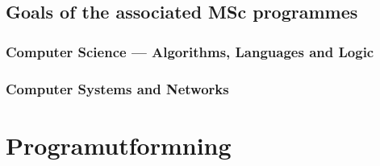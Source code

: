 \documentclass[twocolumn]{article}
\begin{document}



\subsection{Goals of the associated MSc programmes}
\subsubsection{Computer Science --- Algorithms, Languages and Logic}


\subsubsection{Computer Systems and Networks}



\section{Programutformning}
\newcommand{\courselink}[2]{\href{https://www.student.chalmers.se/sp/course?course_id=#1}{#2}}

\newcommand{\introFP }{\courselink{16717}{Introduktion till funktionell programmering}}
\newcommand{\DiskMat }{\courselink{16714}{Inledande diskret matematik}}
\newcommand{\DigoDat }{\courselink{16012}{Grundläggande datorteknik (ny)}}
\newcommand{\LinAlg  }{\courselink{16376}{Linjär algebra}}
\newcommand{\MOP     }{\courselink{15446}{Programmering av inbyggda system (ny)}}
\newcommand{\MatAn   }{\courselink{15413}{Matematisk analys}}
\newcommand{\OOP     }{\courselink{16190}{Objektorienterad programmering (flyttad)}}
\newcommand{\ElKrets }{\courselink{15353}{Elektriska kretsar och fält}}
\end{document}

